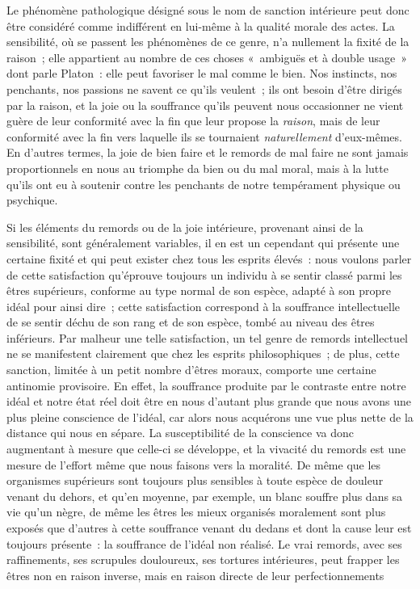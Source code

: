 \documentclass[french,twoside]{book} %
\begin{document}
Le phénomène pathologique désigné sous le nom de sanction intérieure peut donc être considéré comme indifférent en lui-même à la qualité morale des actes. La sensibilité, où se passent les phénomènes de ce genre, n’a nullement la fixité de la raison ; elle appartient au nombre de ces choses « ambiguës et à double usage » dont parle Platon : elle peut favoriser le mal comme le bien. Nos instincts, nos penchants, nos passions ne savent ce qu’ils veulent ; ils ont besoin d’être dirigés par la raison, et la joie ou la souffrance qu’ils peuvent nous occasionner ne vient guère de leur conformité avec la fin que leur propose la \emph{raison}, mais de leur conformité avec la fin vers laquelle ils se tournaient \emph{naturellement} d’eux-mêmes. En d’autres termes, la joie de bien faire et le remords de mal faire ne sont jamais proportionnels en nous au triomphe da bien ou du mal moral, mais à la lutte qu’ils ont eu à soutenir contre les penchants de notre tempérament physique ou psychique.\par
Si les éléments du remords ou de la joie intérieure, provenant ainsi de la sensibilité, sont généralement variables, il en est un cependant qui présente une certaine fixité et qui peut exister chez tous les esprits élevés : nous voulons parler de cette satisfaction qu’éprouve toujours un individu à se sentir classé parmi les êtres supérieurs, conforme au type normal de son espèce, adapté à son propre idéal pour ainsi dire ; cette satisfaction correspond à la souffrance intellectuelle de se sentir déchu de son rang et de son espèce, tombé au niveau des êtres inférieurs. Par malheur une telle satisfaction, un tel genre de remords intellectuel ne se manifestent clairement que chez les esprits philosophiques ; de plus, cette sanction, limitée à un petit nombre d’êtres moraux, comporte une certaine antinomie provisoire. En effet, la souffrance produite par le contraste entre notre idéal et notre état réel doit être en nous d’autant plus grande que nous avons une plus pleine conscience de l’idéal, car alors nous acquérons une vue plus nette de la distance qui nous en sépare. La susceptibilité de la conscience va donc augmentant à mesure que celle-ci se développe, et la vivacité du remords est une mesure de l’effort même que nous faisons vers la moralité. De même que les organismes supérieurs sont toujours plus sensibles à toute espèce de douleur venant du dehors, et qu’en moyenne, par exemple, un blanc souffre plus dans sa vie qu’un nègre, de même les êtres les mieux organisés moralement sont plus exposés que d’autres à cette souffrance venant du dedans et dont la cause leur est toujours présente : la souffrance de l’idéal non réalisé. Le vrai remords, avec ses raffinements, ses scrupules douloureux, ses tortures intérieures, peut frapper les êtres non en raison inverse, mais en raison directe de leur perfectionnements\par
\end{document}
